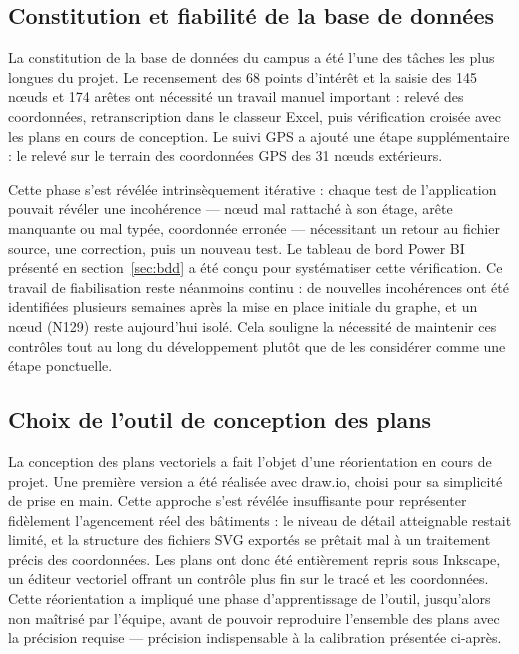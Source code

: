 \documentclass[12pt,a4paper]{report}
\begin{document}
\subsection{Constitution et fiabilité de la base de données}

La constitution de la base de données du campus a été l'une des tâches les plus longues du projet.
Le recensement des 68 points d'intérêt et la saisie des 145 nœuds et 174 arêtes ont nécessité un
travail manuel important : relevé des coordonnées, retranscription dans le classeur Excel, puis
vérification croisée avec les plans en cours de conception. Le suivi GPS a ajouté une étape
supplémentaire : le relevé sur le terrain des coordonnées GPS des 31 nœuds extérieurs.

Cette phase s'est révélée intrinsèquement itérative : chaque test de l'application pouvait révéler
une incohérence — nœud mal rattaché à son étage, arête manquante ou mal typée, coordonnée erronée —
nécessitant un retour au fichier source, une correction, puis un nouveau test. Le tableau de bord
Power BI présenté en section~\ref{sec:bdd} a été conçu pour systématiser cette vérification. Ce
travail de fiabilisation reste néanmoins continu : de nouvelles incohérences ont été identifiées
plusieurs semaines après la mise en place initiale du graphe, et un nœud (N129) reste aujourd'hui
isolé. Cela souligne la nécessité de maintenir ces contrôles tout au long du développement plutôt
que de les considérer comme une étape ponctuelle.

\subsection{Choix de l'outil de conception des plans}

La conception des plans vectoriels a fait l'objet d'une réorientation en cours de projet. Une
première version a été réalisée avec draw.io, choisi pour sa simplicité de prise en main. Cette
approche s'est révélée insuffisante pour représenter fidèlement l'agencement réel des bâtiments :
le niveau de détail atteignable restait limité, et la structure des fichiers SVG exportés se
prêtait mal à un traitement précis des coordonnées. Les plans ont donc été entièrement repris sous
Inkscape, un éditeur vectoriel offrant un contrôle plus fin sur le tracé et les coordonnées. Cette
réorientation a impliqué une phase d'apprentissage de l'outil, jusqu'alors non maîtrisé par
l'équipe, avant de pouvoir reproduire l'ensemble des plans avec la précision requise — précision
indispensable à la calibration présentée ci-après.
\end{document}
